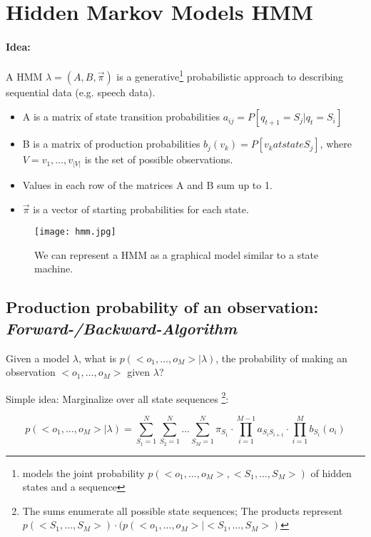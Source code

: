 
\section*{Hidden Markov Models HMM}
\paragraph{Idea:}  A HMM \(\lambda = (A, B, \vec{\pi})\) is a generative\footnote{models the joint probability $p(<o_1,\dots, o_M>, <S_1,\dots, S_M>)$ of hidden states and a sequence} probabilistic approach to describing sequential data (e.g. speech data).

\begin{itemize}
	\item A is a matrix of state transition probabilities \(a_{ij} = P[q_{t+1} = S_j | q_t = S_i]\)
	\item B is a matrix of production probabilities \(b_j(v_k) = P[v_k at state S_j]\), where \(V={v_1,\dots,v_{|V|}}\) is the set of possible observations.
	\item Values in each row of the matrices A and B sum up to 1.
	\item \(\vec{\pi}\) is a vector of starting probabilities for each state.
\end{itemize}

\begin{figure}[H]
	\centering
	\texttt{[image: hmm.jpg]}
	\caption{We can represent a HMM as a graphical model similar to a state machine.}
\end{figure}



\subsection*{Production probability of an observation: \emph{Forward-/Backward-Algorithm}}
Given a model \(\lambda\), what is \(p(<o_1,\dots, o_M>|\lambda)\), the probability of making an observation \(<o_1,\dots, o_M>\) given \(\lambda\)?

Simple idea: Marginalize over all state sequences \footnote{The sums enumerate all possible state sequences; The products represent \(p(<S_1,\dots,S_M>) \cdot (p(<o_1,\dots, o_M>|<S_1,\dots,S_M>)\)}:

\[p(<o_1,\dots,o_M>|\lambda) = \sum_{S_1=1}^{N} \sum_{S_2=1}^{N} \dots \sum_{S_M=1}^{N} \pi_{S_1} \cdot \prod_{i=1}^{M-1} a_{S_i S_{i+1}} \cdot \prod_{i=1}^{M} b_{S_i}(o_i)\]

